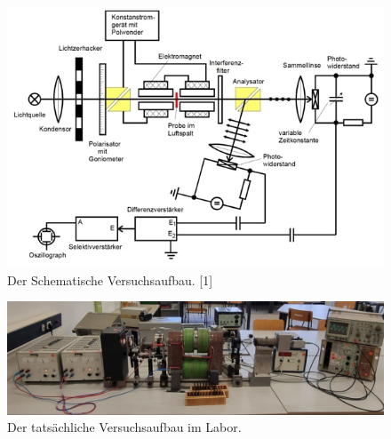 \begin{figure}
    \centering
    \includegraphics[width=1\textwidth]{content/grafiken/versuchsaufbau.JPG}
    \caption{Der Schematische Versuchsaufbau. [1]}
    \label{fig:versuchsaufbau}
  \end{figure}

  \begin{figure}
    \centering
    \includegraphics[width=1\textwidth]{content/grafiken/realer versuchsaufbau.JPG}
    \caption{Der tatsächliche Versuchsaufbau im Labor.}
    \label{fig:realaufbau}
  \end{figure}

